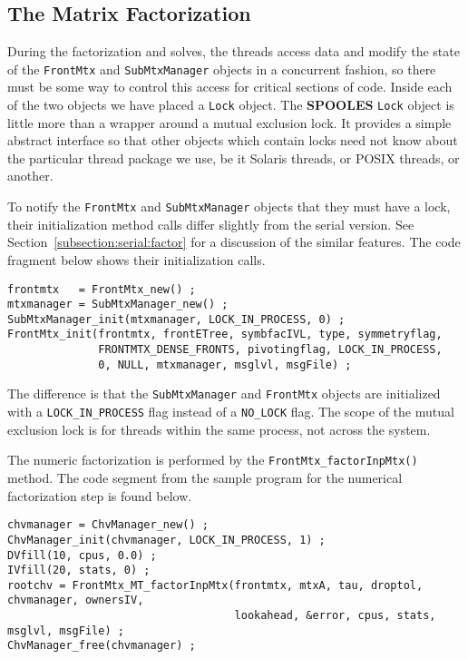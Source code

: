 \subsection{The Matrix Factorization}
\label{subsection:MT:factor}
\par
During the factorization and solves, the threads access data 
and modify the state of the {\tt FrontMtx} and {\tt SubMtxManager} 
objects in a concurrent fashion,
so there must be some way to control this access for critical
sections of code.
Inside each of the two objects we have placed a {\tt Lock} object.
The {\bf SPOOLES} {\tt Lock} object is little more than a wrapper
around a mutual exclusion lock.
It provides a simple abstract interface so that other objects which
contain locks need not know about the particular thread package we use,
be it Solaris threads, or POSIX threads, or another.
\par
To notify the {\tt FrontMtx} and {\tt SubMtxManager} objects that
they must have a lock, their initialization method calls differ
slightly from the serial version.
See Section~\ref{subsection:serial:factor} for a
discussion of the similar features.
The code fragment below shows their initialization calls.
\par
\begin{verbatim}
frontmtx   = FrontMtx_new() ;
mtxmanager = SubMtxManager_new() ;
SubMtxManager_init(mtxmanager, LOCK_IN_PROCESS, 0) ;
FrontMtx_init(frontmtx, frontETree, symbfacIVL, type, symmetryflag,
              FRONTMTX_DENSE_FRONTS, pivotingflag, LOCK_IN_PROCESS,
              0, NULL, mtxmanager, msglvl, msgFile) ;
\end{verbatim}
The difference is that the {\tt SubMtxManager} and {\tt FrontMtx}
objects are initialized with a {\tt LOCK\_IN\_PROCESS} flag instead 
of a {\tt NO\_LOCK} flag.
The scope of the mutual exclusion lock is for threads within the
same process, not across the system.
\par
The numeric factorization is performed by the
{\tt FrontMtx\_factorInpMtx()} method.
The code segment from the sample program for the numerical
factorization step is found below.
\begin{verbatim}
chvmanager = ChvManager_new() ;
ChvManager_init(chvmanager, LOCK_IN_PROCESS, 1) ;
DVfill(10, cpus, 0.0) ;
IVfill(20, stats, 0) ;
rootchv = FrontMtx_MT_factorInpMtx(frontmtx, mtxA, tau, droptol, chvmanager, ownersIV, 
                                   lookahead, &error, cpus, stats, msglvl, msgFile) ;
ChvManager_free(chvmanager) ;
\end{verbatim}
